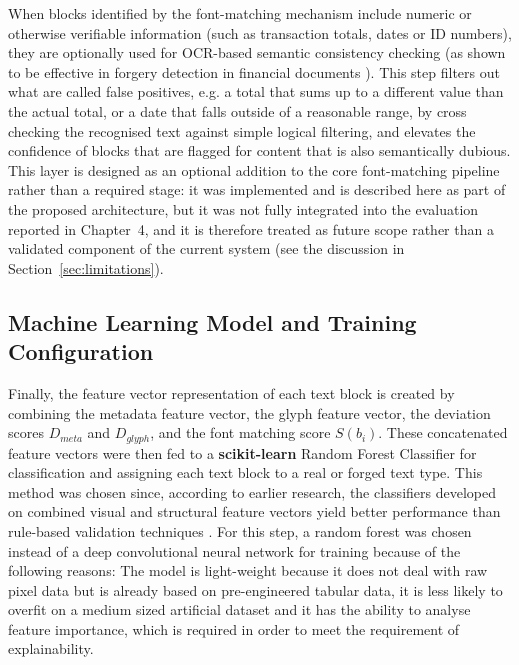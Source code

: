 When blocks identified by the font-matching mechanism include numeric or otherwise verifiable information (such as transaction totals, dates or ID numbers), they are optionally used for OCR-based semantic consistency checking (as shown to be effective in forgery detection in financial documents \cite{Cohen2025Forgery, Ahmed2025AIForgeries}). This step filters out what are called false positives, e.g. a total that sums up to a different value than the actual total, or a date that falls outside of a reasonable range, by cross checking the recognised text against simple logical filtering, and elevates the confidence of blocks that are flagged for content that is also semantically dubious. This layer is designed as an optional addition to the core font-matching pipeline rather than a required stage: it was implemented and is described here as part of the proposed architecture, but it was not fully integrated into the evaluation reported in Chapter~4, and it is therefore treated as future scope rather than a validated component of the current system (see the discussion in Section~\ref{sec:limitations}).

\subsection{Machine Learning Model and Training Configuration}

Finally, the feature vector representation of each text block is created by combining the metadata feature vector, the glyph feature vector, the deviation scores $D_{meta}$ and $D_{glyph}$, and the font matching score $S(b_i)$. These concatenated feature vectors were then fed to a \textbf{scikit-learn} Random Forest Classifier for classification and assigning each text block to a real or forged text type. This method was chosen since, according to earlier research, the classifiers developed on combined visual and structural feature vectors yield better performance than rule-based validation techniques \cite{Ahmed2025AIForgeries,Kumar2025RealTimeFraud}. For this step, a random forest was chosen instead of a deep convolutional neural network for training because of the following reasons: The model is light-weight because it does not deal with raw pixel data but is already based on pre-engineered tabular data, it is less likely to overfit on a medium sized artificial dataset and it has the ability to analyse feature importance, which is required in order to meet the requirement of explainability.\\

